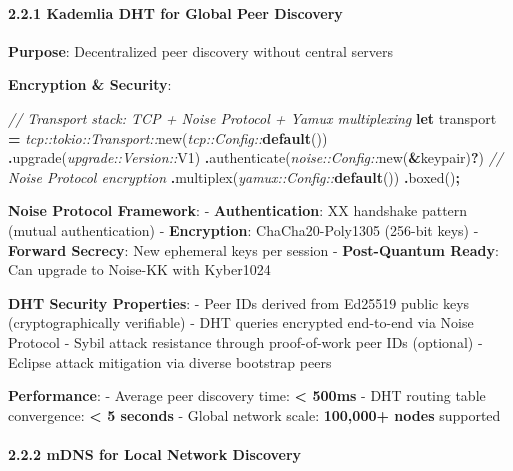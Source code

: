 \documentclass[
  11pt,
]{article}
\newenvironment{Shaded}{\begin{snugshade}}{\end{snugshade}}
\newcommand{\CommentTok}[1]{\textcolor[rgb]{0.56,0.35,0.01}{\textit{#1}}}
\newcommand{\KeywordTok}[1]{\textcolor[rgb]{0.13,0.29,0.53}{\textbf{#1}}}
\newcommand{\NormalTok}[1]{#1}
\newcommand{\OperatorTok}[1]{\textcolor[rgb]{0.81,0.36,0.00}{\textbf{#1}}}
\newcommand{\PreprocessorTok}[1]{\textcolor[rgb]{0.56,0.35,0.01}{\textit{#1}}}
\begin{document}
\hypertarget{kademlia-dht-for-global-peer-discovery}{%
\paragraph{2.2.1 Kademlia DHT for Global Peer
Discovery}\label{kademlia-dht-for-global-peer-discovery}}

\textbf{Purpose}: Decentralized peer discovery without central servers

\textbf{Encryption \& Security}:

\begin{Shaded}
\begin{Highlighting}[]
\CommentTok{// Transport stack: TCP + Noise Protocol + Yamux multiplexing}
\KeywordTok{let}\NormalTok{ transport }\OperatorTok{=} \PreprocessorTok{tcp::tokio::Transport::}\NormalTok{new(}\PreprocessorTok{tcp::Config::}\KeywordTok{default}\NormalTok{())}
    \OperatorTok{.}\NormalTok{upgrade(}\PreprocessorTok{upgrade::Version::}\NormalTok{V1)}
    \OperatorTok{.}\NormalTok{authenticate(}\PreprocessorTok{noise::Config::}\NormalTok{new(}\OperatorTok{\&}\NormalTok{keypair)}\OperatorTok{?}\NormalTok{)  }\CommentTok{// Noise Protocol encryption}
    \OperatorTok{.}\NormalTok{multiplex(}\PreprocessorTok{yamux::Config::}\KeywordTok{default}\NormalTok{())}
    \OperatorTok{.}\NormalTok{boxed()}\OperatorTok{;}
\end{Highlighting}
\end{Shaded}

\textbf{Noise Protocol Framework}: - \textbf{Authentication}: XX
handshake pattern (mutual authentication) - \textbf{Encryption}:
ChaCha20-Poly1305 (256-bit keys) - \textbf{Forward Secrecy}: New
ephemeral keys per session - \textbf{Post-Quantum Ready}: Can upgrade to
Noise-KK with Kyber1024

\textbf{DHT Security Properties}: - Peer IDs derived from Ed25519 public
keys (cryptographically verifiable) - DHT queries encrypted end-to-end
via Noise Protocol - Sybil attack resistance through proof-of-work peer
IDs (optional) - Eclipse attack mitigation via diverse bootstrap peers

\textbf{Performance}: - Average peer discovery time: \textbf{\textless{}
500ms} - DHT routing table convergence: \textbf{\textless{} 5 seconds} -
Global network scale: \textbf{100,000+ nodes} supported

\hypertarget{mdns-for-local-network-discovery}{%
\paragraph{2.2.2 mDNS for Local Network
Discovery}\label{mdns-for-local-network-discovery}}
\end{document}
